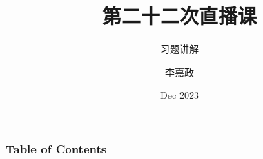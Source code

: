 \documentclass[10pt,hyperref={CJKbookmarks=true}]{beamer}
\title[第二十二次直播课] %
{第二十二次直播课}
\subtitle{习题讲解}
\author[李嘉政] %
{李嘉政}
\date[VLC 2021] %
{Dec 2023}
\begin{document}
\frame{\titlepage}


\begin{frame}
\frametitle{Table of Contents}
\tableofcontents
\end{frame}











%
% 
% 
% 










\end{document}
